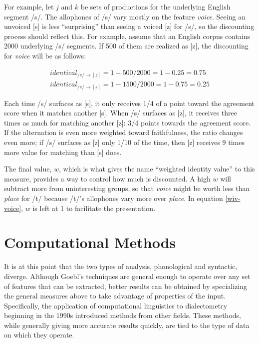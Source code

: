 \documentclass[11pt]{article}
\begin{document}
  For example, let $j$ and $k$ be sets of productions for the
  underlying English segment /s/. The allophones of /s/ vary mostly on the feature
  \textit{voice}. Seeing an unvoiced [s] is less ``surprising'' than
  seeing a voiced [z] for /s/, so the discounting process should
  reflect this. For example, assume that an English corpus contains 2000
  underlying /s/ segments. If 500 of them are realized as [z], the
  discounting for \textit{voice} will be as follows:

  \begin{equation}
    \begin{array}{c}
      identical_{/s/\to[z]} = 1 - 500/2000 = 1 - 0.25 = 0.75 \\
      identical_{/s/\to[s]} = 1 - 1500/2000 = 1 - 0.75 = 0.25
    \end{array}
    \label{wiv-voice}
  \end{equation}

  Each time /s/ surfaces as [s], it only receives 1/4 of a point
  toward the agreement score when it matches another [s]. When /s/
  surfaces as [z], it receives three times as much for matching
  another [z]: 3/4 points towards the agreement score. If the
  alternation is even more weighted toward faithfulness, the ratio
  changes even more; if /s/ surfaces as [z] only 1/10 of the time,
  then [z] receives 9 times more value for matching than [s] does.

  The final value, $w$, which is what gives the name ``weighted
  identity value'' to this measure, provides a way to control how much
  is discounted. A high $w$ will subtract more from uninteresting
  groups, so that \textit{voice} might be worth less than
  \textit{place} for /t/ because /t/'s allophones vary more over
  \textit{place}. In equation \ref{wiv-voice}, $w$ is left at 1 to
  facilitate the presentation.

\section{Computational Methods}

It is at this point that the two types of analysis, phonological and
syntactic, diverge. Although Goebl's techniques are general enough to
operate over any set of features that can be extracted, better results
can be obtained by specializing the general measures above to take
advantage of properties of the input.  Specifically, the application
of computational linguistics to dialectometry beginning in the 1990s
introduced methods from other fields. These methods, while generally
giving more accurate results quickly, are tied to the type of data on
which they operate.
\end{document}
